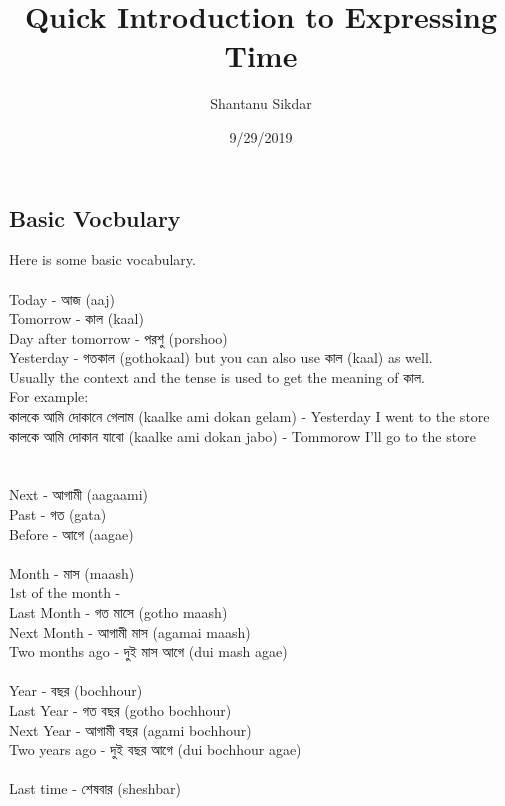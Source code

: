 \documentclass{article}
\title{ Quick Introduction to Expressing Time }
\author{Shantanu Sikdar}
\date{9/29/2019}
\begin{document}
\maketitle


\subsection{Basic Vocbulary}
Here is some basic vocabulary. \\
\\
Today - আজ  (aaj) \\
Tomorrow - কাল (kaal) \\
Day after tomorrow - পরশু (porshoo) \\
Yesterday - গতকাল (gothokaal) but you can also use কাল (kaal) as well. \\
Usually the context and the tense is used to get the meaning of কাল. \\
For example: \\
কালকে আমি দোকানে গেলাম (kaalke ami dokan gelam) - Yesterday I went to the store \\
কালকে আমি দোকান যাবো (kaalke ami dokan jabo) - Tommorow I'll go to the store \\
\\
\\
Next - আগামী (aagaami) \\
Past - গত (gata) \\
Before - আগে (aagae) \\
\\
Month - মাস (maash) \\
1st of the month - \\
Last Month - গত মাসে (gotho maash) \\
Next Month - আগামী মাস (agamai maash) \\
Two months ago - দুই মাস আগে (dui mash agae) \\
\\
Year - বছর (bochhour) \\
Last Year - গত বছর (gotho bochhour) \\
Next Year - আগামী বছর (agami bochhour) \\
Two years ago - দুই বছর আগে (dui bochhour agae) \\
\\
Last time - শেষবার (sheshbar)
\end{document}
